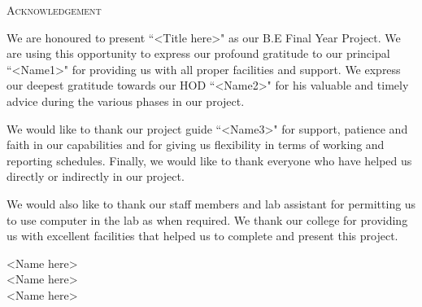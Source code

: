 \newpage
\thispagestyle{empty}

\begin{center}
    \Large \textsc {Acknowledgement}\\[0.5cm]
\end{center}

\normalsize We are honoured to present ``<Title here>" as our B.E Final Year Project.
We are using this opportunity to express our profound gratitude to our principal ``<Name1>" for
providing us with all proper facilities and support.
We express our deepest gratitude towards our HOD ``<Name2>" for his valuable
and timely advice during the various phases in our project.

\vspace{0.5cm}

We would like to thank our project guide ``<Name3>" for support, patience and faith in our capabilities
and for giving us flexibility in terms of working and reporting schedules.
Finally, we would like to thank everyone who have helped us directly or indirectly in our project.

\vspace{0.5cm}

We would also like to thank our staff members and lab assistant for permitting us to use
computer in the lab as when required. We thank our college for providing us with excellent
facilities that helped us to complete and present this project.

\vspace{0.5cm}

\begin{flushleft}
    <Name here>\\[0.2cm]
    <Name here>\\[0.2cm]
    <Name here>\\[0.2cm]
\end{flushleft}
